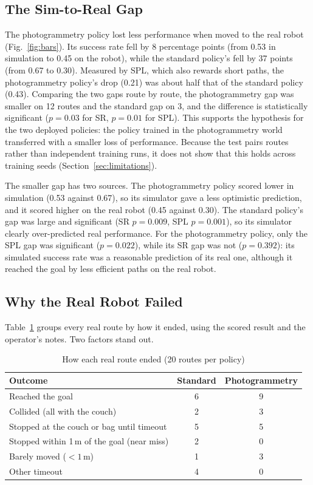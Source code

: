 \subsection{The Sim-to-Real Gap}
The photogrammetry policy lost less performance when moved to the real robot (Fig.~\ref{fig:bars}).
Its success rate fell by 8 percentage points (from 0.53 in simulation to 0.45 on the robot), while
the standard policy's fell by 37 points (from 0.67 to 0.30). Measured by SPL, which also rewards
short paths, the photogrammetry policy's drop (0.21) was about half that of the standard policy
(0.43). Comparing the two gaps route by route, the photogrammetry gap was smaller on 12 routes and
the standard gap on 3, and the difference is statistically significant ($p=0.03$ for SR, $p=0.01$
for SPL). This supports the hypothesis for the two deployed policies: the policy trained in the
photogrammetry world transferred with a smaller loss of performance. Because the test pairs routes
rather than independent training runs, it does not show that this holds across training seeds
(Section~\ref{sec:limitations}).

The smaller gap has two sources. The photogrammetry policy scored lower in simulation
(0.53 against 0.67), so its simulator gave a less optimistic prediction,
and it scored higher on the real robot (0.45 against 0.30). The standard
policy's gap was large and significant (SR $p=0.009$, SPL $p=0.001$), so its
simulator clearly over-predicted real performance. For the photogrammetry policy, only the SPL
gap was significant ($p=0.022$), while its SR gap was not ($p=0.392$): its
simulated success rate was a reasonable prediction of its real one, although it reached the goal
by less efficient paths on the real robot.

\subsection{Why the Real Robot Failed}\label{sec:results-why}
Table~\ref{tab:failures} groups every real route by how it ended, using the scored result and the
operator's notes. Two factors stand out.

\begin{table}[t]
\caption{How each real route ended (20 routes per policy)}
\label{tab:failures}
\centering
\footnotesize
\begin{tabular}{@{}lcc@{}}
\toprule
Outcome & Standard & Photogrammetry \\
\midrule
Reached the goal & 6 & 9 \\
Collided (all with the couch) & 2 & 3 \\
Stopped at the couch or bag until timeout & 5 & 5 \\
Stopped within 1\,m of the goal (near miss) & 2 & 0 \\
Barely moved ($<1$\,m) & 1 & 3 \\
Other timeout & 4 & 0 \\
\bottomrule
\end{tabular}
\end{table}

